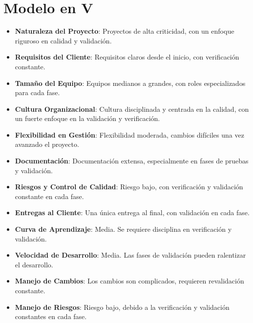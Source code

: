\section{Modelo en V}
\begin{itemize}
    \item \textbf{Naturaleza del Proyecto}: Proyectos de alta criticidad, con un enfoque riguroso en calidad y validación.
    \item \textbf{Requisitos del Cliente}: Requisitos claros desde el inicio, con verificación constante.
    \item \textbf{Tamaño del Equipo}: Equipos medianos a grandes, con roles especializados para cada fase.
    \item \textbf{Cultura Organizacional}: Cultura disciplinada y centrada en la calidad, con un fuerte enfoque en la validación y verificación.
    \item \textbf{Flexibilidad en Gestión}: Flexibilidad moderada, cambios difíciles una vez avanzado el proyecto.
    \item \textbf{Documentación}: Documentación extensa, especialmente en fases de pruebas y validación.
    \item \textbf{Riesgos y Control de Calidad}: Riesgo bajo, con verificación y validación constante en cada fase.
    \item \textbf{Entregas al Cliente}: Una única entrega al final, con validación en cada fase.
    \item \textbf{Curva de Aprendizaje}: Media. Se requiere disciplina en verificación y validación.
    \item \textbf{Velocidad de Desarrollo}: Media. Las fases de validación pueden ralentizar el desarrollo.
    \item \textbf{Manejo de Cambios}: Los cambios son complicados, requieren revalidación constante.
    \item \textbf{Manejo de Riesgos}: Riesgo bajo, debido a la verificación y validación constantes en cada fase.
\end{itemize}

